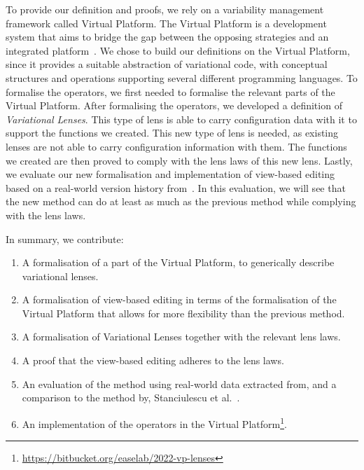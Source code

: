 To provide our definition and proofs, we rely on a variability management
framework called Virtual Platform. The Virtual Platform is a development system
that aims to bridge the gap between the opposing strategies \emph{\co} and
an integrated platform~\cite{mahmood2021}.
We chose to build our definitions on the Virtual Platform, since it provides a suitable abstraction of
variational code, with conceptual structures and operations supporting several 
different programming languages.
To formalise the operators, we first needed to formalise the relevant parts of the 
Virtual Platform. After formalising the operators, we developed a
definition of \emph{Variational Lenses}. This type of lens is able to carry
configuration data with it to support the functions we created. This new type of
lens is needed, as existing lenses are not able to carry configuration information
with them. The functions we created are then proved to comply with the lens laws 
of this new lens. Lastly, we evaluate our new formalisation and implementation of view-based editing
based on a real-world version history from~\cite{stuanciulescu2016}. In this evaluation,
we will see that the new method can do at least as much as the previous method
while complying with the lens laws. 

In summary, we contribute:
\begin{enumerate}
    \item A formalisation of a part of the Virtual Platform, to generically describe variational lenses.
    \item A formalisation of view-based editing in terms of the formalisation of the Virtual Platform that allows for more flexibility than the previous method.
    \item A formalisation of Variational Lenses together with the relevant lens laws.
    \item A proof that the view-based editing adheres to the lens laws.
    \item An evaluation of the method using real-world data extracted from, and a comparison to the method by, Stanciulescu et al.~\cite{stuanciulescu2016}.
    \item An implementation of the operators in the Virtual Platform\footnote{\url{https://bitbucket.org/easelab/2022-vp-lenses}}.
\end{enumerate}
